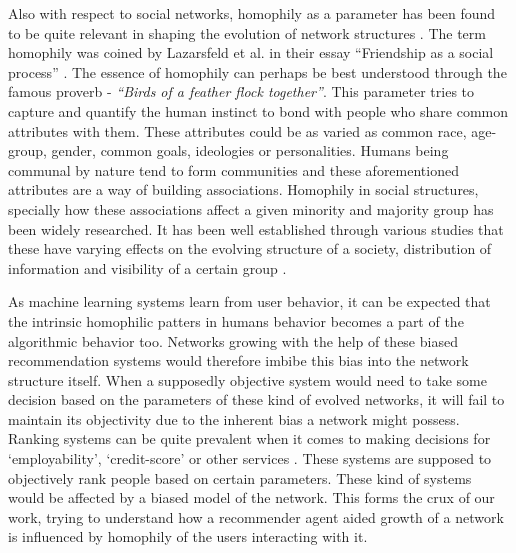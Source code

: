 Also with respect to social networks, homophily as a parameter has been found to be quite relevant in shaping the evolution of network structures \cite{dong2017structural,mcpherson2001birds}. The term homophily was coined by Lazarsfeld et al. in their essay ``Friendship as a social process'' \cite{lazarsfeld1954friendship}. The essence of homophily can perhaps be best understood through the famous proverb -  \textit{``Birds of a feather flock together''}. This parameter tries to capture and  quantify the human instinct to bond with people who share common attributes with them. These attributes could be as varied as common race, age-group, gender, common goals, ideologies or personalities. Humans being communal by nature tend to form communities and these aforementioned attributes are a way of building associations. Homophily in social structures, specially how these associations affect a given minority and majority group has been widely researched. It has been well established through various studies that these have varying effects on the evolving structure of a society, distribution of information and visibility of a certain group \cite{stoica2018algorithmic,avin2015homophily,mcpherson2001birds,karimi2018homophily}. 

As machine learning systems learn from user behavior, it can be expected that the intrinsic homophilic patters in humans behavior becomes a part of the algorithmic behavior too. Networks growing with the help of these biased recommendation systems would therefore imbibe this bias into the network structure itself. When a supposedly objective system would need to take some decision based on the parameters of these kind of evolved networks, it will fail to maintain its objectivity due to the inherent bias a network might possess. Ranking systems can be quite prevalent when it comes to making decisions for `employability', `credit-score' or other services \cite{heap2014combining,kalayci2018credit}. These systems are supposed to objectively rank people based on certain parameters. These kind of systems would be affected by a biased model of the network. This forms the crux of our work, trying to understand how a recommender agent aided growth of a network is influenced by homophily of the users interacting with it. 


